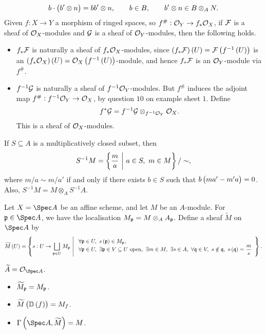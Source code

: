 \begin{definition*}
\begin{itemize}
$$ b \cdot \br{b' \otimes n} = bb' \otimes n, \qquad b \in B, \qquad b' \otimes n \in B \otimes_A N. $$
Given $ f : X \to Y $ a morphism of ringed spaces, so $ f^\# : \mathcal{O}_Y \to f_*\mathcal{O}_X $, if $ \mathcal{F} $ is a sheaf of $ \mathcal{O}_X $-modules and $ \mathcal{G} $ is a sheaf of $ \mathcal{O}_Y $-modules, then the following holds.
\begin{itemize}
\item $ f_*\mathcal{F} $ is naturally a sheaf of $ f_*\mathcal{O}_X $-modules, since $ \br{f_*\FFF}\br{U} = \FFF\br{f^{-1}\br{U}} $ is an $ \br{f_*\OOO_X}\br{U} = \OOO_X\br{f^{-1}\br{U}} $-module, and hence $ f_*\mathcal{F} $ is an $ \mathcal{O}_Y $-module via $ f^\# $.
\item $ f^{-1}\mathcal{G} $ is naturally a sheaf of $ f^{-1}\mathcal{O}_Y $-modules. But $ f^\# $ induces the adjoint map $ f^\# : f^{-1}\mathcal{O}_Y \to \mathcal{O}_X $, by question $ 10 $ on example sheet $ 1 $. Define
$$ f^*\mathcal{G} = f^{-1}\mathcal{G} \otimes_{f^{-1}\mathcal{O}_Y} \mathcal{O}_X. $$
This is a sheaf of $ \mathcal{O}_X $-modules.
\end{itemize}
\end{itemize}
\end{definition*}

If $ S \subseteq A $ is a multiplicatively closed subset, then
$$ S^{-1}M = \cbr{\dfrac{m}{a} \st a \in S, \ m \in M} / \sim, $$
where $ m / a \sim m / a' $ if and only if there exists $ b \in S $ such that $ b\br{ma' - m'a} = 0 $. Also, $ S^{-1}M = M \otimes_A S^{-1}A $.

\begin{example*}
Let $ X = \Spec A $ be an affine scheme, and let $ M $ be an $ A $-module. For $ \ppp \in \Spec A $, we have the localisation $ M_{\mathfrak{p}} = M \otimes_A A_{\mathfrak{p}} $. Define a sheaf $ \widetilde{M} $ on $ \Spec A $ by
$$ \widetilde{M}\br{U} = \cbr{s : U \to \bigsqcup_{\ppp \in U} M_\ppp \st \begin{array}{l} \forall \ppp \in U, \ s\br{\ppp} \in M_\ppp, \\ \forall \ppp \in U, \ \exists \ppp \in V \subseteq U \ \text{open}, \ \exists m \in M, \ \exists s \in A, \ \forall \qqq \in V, \ s \notin \qqq, \ s\br{\qqq} = \dfrac{m}{s} \end{array}}. $$
\end{example*}

\begin{example*}
$ \widetilde{A} = \OOO_{\Spec A} $.
\end{example*}

\pagebreak

\begin{proposition}
\hfill
\begin{itemize}
\item $ \widetilde{M}_{\mathfrak{p}} = M_{\mathfrak{p}} $.
\item $ \widetilde{M}\br{\DD\br{f}} = M_f $.
\item $ \Gamma\br{\Spec A, \widetilde{M}} = M $.
\end{itemize}
\end{proposition}

